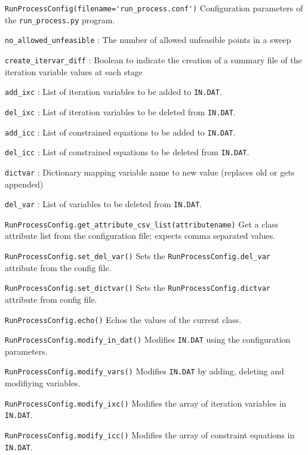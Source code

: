 \documentclass[11pt,a4paper]{article}
\newcommand{\indat}{\mbox{\texttt{IN.DAT}}}
\begin{document}
\begin{description}

\item{\verb|RunProcessConfig(filename='run_process.conf')|} Configuration
  parameters of the \verb|run_process.py| program.

  \verb|no_allowed_unfeasible| : The number of allowed unfeasible points in a
  sweep

  \verb|create_itervar_diff| : Boolean to indicate the creation of a summary
  file of the iteration variable values at each stage

  \verb|add_ixc| : List of iteration variables to be added to \indat.

  \verb|del_ixc| : List of iteration variables to be deleted from \indat.

  \verb|add_icc| : List of constrained equations to be added to \indat.

  \verb|del_icc| : List of constrained equations to be deleted from \indat.

  \verb|dictvar| : Dictionary mapping variable name to new value (replaces old
  or gets appended)

  \verb|del_var| : List of variables to be deleted from \indat.

\item{\verb|RunProcessConfig.get_attribute_csv_list(attributename)|} Get a
  class attribute list from the configuration file; expects comma separated
  values.

\item{\verb|RunProcessConfig.set_del_var()|} Sets the
  \verb|RunProcessConfig.del_var| attribute from the config file.

\item{\verb|RunProcessConfig.set_dictvar()|} Sets the
  \verb|RunProcessConfig.dictvar| attribute from config file.

\item{\verb|RunProcessConfig.echo()|} Echos the values of the current class.

\item{\verb|RunProcessConfig.modify_in_dat()|} Modifies \indat\/ using the
  configuration parameters.

\item{\verb|RunProcessConfig.modify_vars()|} Modifies \indat\/ by adding,
  deleting and modifiying variables.

\item{\verb|RunProcessConfig.modify_ixc()|} Modifies the array of iteration
  variables in \indat.

\item{\verb|RunProcessConfig.modify_icc()|} Modifies the array of constraint
  equations in \indat.

\end{description}
\end{document}
